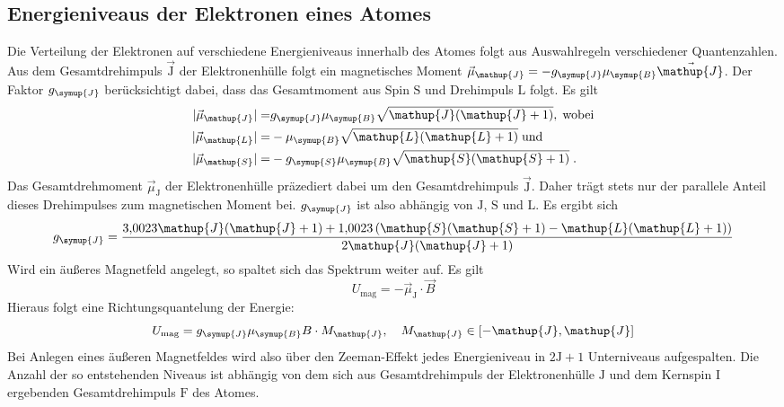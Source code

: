 \documentclass[
  bibliography=totoc,     %
  captions=tableheading,  %
  titlepage=firstiscover, %
]{scrartcl}
\begin{document}
\subsection{Energieniveaus der Elektronen eines Atomes}
%
Die Verteilung der Elektronen auf verschiedene Energieniveaus innerhalb des
Atomes folgt aus Auswahlregeln verschiedener Quantenzahlen. Aus dem
Gesamtdrehimpuls $\vec{\mathup{J}}$ der Elektronenhülle folgt ein magnetisches Moment
$\vec{\mu}_\mathup{J}=-g_{\symup{J}}\mu_{\symup{B}}\vec{\mathup{J}}$. Der Faktor $g_{\symup{J}}$
berücksichtigt dabei, dass das Gesamtmoment aus Spin $\mathup{S}$ und Drehimpuls $\mathup{L}$
folgt. Es gilt
%
\begin{align*}
  |\vec{\mu}_\mathup{J}|=&g_{\symup{J}}\mu_{\symup{B}}\sqrt{\mathup{J}(\mathup{J}+1)},\;\text{wobei} \\
  |\vec{\mu}_\mathup{L}|=&-\mu_{\symup{B}}\sqrt{\mathup{L}(\mathup{L}+1)}\;\text{und} \\
  |\vec{\mu}_\mathup{S}|=&-g_{\symup{S}}\mu_{\symup{B}}\sqrt{\mathup{S}(\mathup{S}+1)}\;.
\end{align*}
%
Das Gesamtdrehmoment $\vec{\mu}_\mathup{J}$ der Elektronenhülle präzediert dabei um den
Gesamtdrehimpuls $\vec{\mathup{J}}$. Daher trägt stets nur der parallele Anteil dieses
Drehimpulses zum magnetischen Moment bei. $g_{\symup{J}}$ ist also abhängig von
$\mathup{J}$, $\mathup{S}$ und $\mathup{L}$. Es ergibt sich
%
\begin{equation}
  g_{\symup{J}}=\frac{\num{3.0023}\mathup{J}(\mathup{J}+1)+\num{1.0023}\left(\mathup{S}(\mathup{S}+1)-\mathup{L}(\mathup{L}+1)\right)}{2\mathup{J}(\mathup{J}+1)}
  \label{eq:gj}
\end{equation}
%
Wird ein äußeres Magnetfeld angelegt, so spaltet sich das
Spektrum weiter auf. Es gilt
%
\begin{equation}
  U_\text{mag}=-\vec{\mu}_\mathup{J}\cdot\vec{B}
\end{equation}
%
Hieraus folgt eine Richtungsquantelung der Energie:
%
\begin{equation}
  U_\text{mag}=g_{\symup{J}}\mu_{\symup{B}}B\cdot M_\mathup{J},\quad M_\mathup{J}\in[-\mathup{J},\mathup{J}]
\end{equation}
%
Bei Anlegen eines äußeren Magnetfeldes wird also über den Zeeman-Effekt jedes
Energieniveau in $2\mathup{J}+1$ Unterniveaus aufgespalten. Die Anzahl der so
entstehenden Niveaus ist abhängig von dem sich aus Gesamtdrehimpuls der
Elektronenhülle $\mathup{J}$ und dem Kernspin $\mathup{I}$ ergebenden Gesamtdrehimpuls $\mathup{F}$ des
Atomes.
\end{document}
